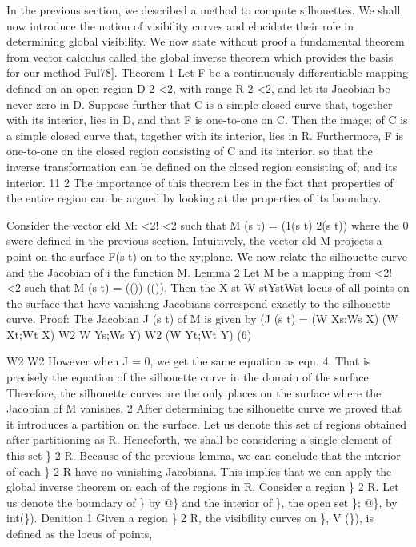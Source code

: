 \documentclass[11pt,letterpaper]{article}
\newcommand{\SectionHeading}[2]{%
  \par\noindent{\fontsize{12}{14}\selectfont\bfseries%
  \if\relax\detokenize{#1}\relax
    #2%
  \else
    #1\hspace{0.35in}#2%
  \fi\par}\vspace{0.1em}%
}
\begin{document}
\SectionHeading{4}{Visibility Curves}
In the previous section, we described a method to compute silhouettes. We shall now introduce the notion of visibility curves and elucidate their role in determining global visibility. We now state without proof a fundamental theorem from vector calculus called the global inverse theorem which provides the basis for our method Ful78]. Theorem 1 Let F be a continuously differentiable mapping defined on an open region D 2 <2, with range R 2 <2, and let its Jacobian be never zero in D. Suppose further that C is a simple closed curve that, together with its interior, lies in D, and that F is one-to-one on C. Then the image; of C is a simple closed curve that, together with its interior, lies in R. Furthermore, F is one-to-one on the closed region consisting of C and its interior, so that the inverse transformation can be defined on the closed region consisting of; and its interior. 11 2 The importance of this theorem lies in the fact that properties of the entire region can be argued by looking at the properties of its boundary.

Consider the vector eld M: <2! <2 such that M (s t) = (1(s t) 2(s t)) where the 0 swere defined in the previous section. Intuitively, the vector eld M projects a point on the surface F(s t) on to the xy;plane. We now relate the silhouette curve and the Jacobian of i the function M. Lemma 2 Let M be a mapping from <2! <2 such that M (s t) = (()) (()). Then the X st W stYstWst locus of all points on the surface that have vanishing Jacobians correspond exactly to the silhouette curve. Proof: The Jacobian J (s t) of M is given by (J (s t) = (W Xs;Ws X) (W Xt;Wt X) W2 W Ys;Ws Y) W2 (W Yt;Wt Y) (6)

W2 W2 However when J = 0, we get the same equation as eqn. 4. That is precisely the equation of the silhouette curve in the domain of the surface. Therefore, the silhouette curves are the only places on the surface where the Jacobian of M vanishes. 2 After determining the silhouette curve we proved that it introduces a partition on the surface. Let us denote this set of regions obtained after partitioning as R. Henceforth, we shall be considering a single element of this set \} 2 R. Because of the previous lemma, we can conclude that the interior of each \} 2 R have no vanishing Jacobians. This implies that we can apply the global inverse theorem on each of the regions in R. Consider a region \} 2 R. Let us denote the boundary of \} by @\} and the interior of \}, the open set \}; @\}, by int(\}). Denition 1 Given a region \} 2 R, the visibility curves on \}, V (\}), is defined as the locus of points,
\end{document}
